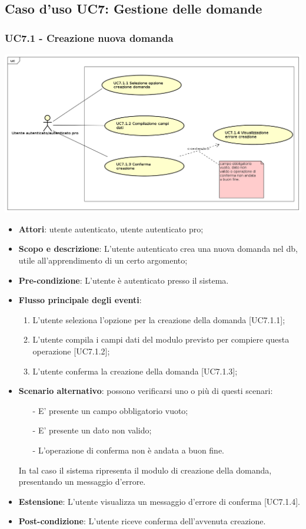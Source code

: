 \subsection{Caso d'uso UC7: Gestione delle domande}
	
\subsubsection{UC7.1 - Creazione nuova domanda}
	\begin{center}
		\includegraphics[scale=0.5]{UML/UC7.1.png}
	\end{center}
	\begin{itemize}
		\item
			\textbf{Attori}: utente autenticato, utente autenticato pro;
		\item		
			\textbf{Scopo e descrizione}: L'utente autenticato crea una nuova domanda nel db, utile all'apprendimento di un certo argomento;
		\item
			\textbf{Pre-condizione}: L'utente è autenticato presso il sistema. 
		\item
			\textbf{Flusso principale degli eventi}:
	       		\begin{enumerate}
					\item 	
					L'utente seleziona l'opzione per la creazione della domanda [UC7.1.1];
					\item
					L'utente compila i campi dati del modulo previsto per compiere questa operazione [UC7.1.2];
					\item
					L'utente conferma la creazione della domanda [UC7.1.3];
	 			\end{enumerate}
	 	\item
	 		\textbf{Scenario alternativo}: possono verificarsi uno o più di questi scenari:
				\begin{itemize}
					\item[-] 	
						E' presente un campo obbligatorio vuoto;
					\item[-] 
    						E' presente  un dato non valido;
					\item[-] 
						L'operazione di conferma non è andata a buon fine.
				\end{itemize}
			In tal caso il sistema ripresenta il modulo di creazione della domanda, presentando un messaggio d'errore.
		\item
			\textbf{Estensione}: L'utente visualizza un messaggio d'errore di conferma [UC7.1.4].
		\item
			\textbf{	Post-condizione}: L'utente riceve conferma dell'avvenuta creazione.
	\end{itemize}
